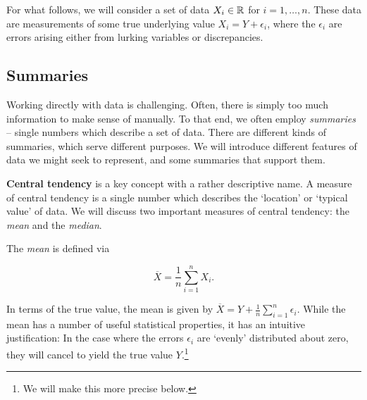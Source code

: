 \documentclass[../primer.tex]{subfiles}
\begin{document}
For what follows, we will consider a set of data $X_i\in\mathbb{R}^{}$ for $i =
1,\dots,n$. These data are measurements of some true underlying value $X_i = Y +
\epsilon_i$, where the $\epsilon_i$ are errors arising either from lurking
variables or discrepancies.

\subsection{Summaries}

Working directly with data is challenging. Often, there is simply too much
information to make sense of manually. To that end, we often employ
\emph{summaries} -- single numbers which describe a set of data. There are
different kinds of summaries, which serve different purposes. We will introduce
different features of data we might seek to represent, and some summaries that
support them.


\textbf{Central tendency} is a key concept with a rather descriptive name. A
measure of central tendency is a single number which describes the `location' or
`typical value' of data. We will discuss two important measures of central
tendency: the \emph{mean} and the \emph{median}.

The \emph{mean} is defined via

\begin{equation} \label{eq:def-sample-mean}
  \overline{X} = \frac{1}{n}\sum_{i=1}^n X_i.
\end{equation}

\noindent In terms of the true value, the mean is given by $\overline{X} = Y +
\frac{1}{n}\sum_{i=1}^n \epsilon_i$. While the mean has a number of useful
statistical properties, it has an intuitive justification: In the case where the
errors $\epsilon_i$ are `evenly' distributed about zero, they will cancel to
yield the true value $Y$.\footnote{We will make this more precise below.}
\end{document}
